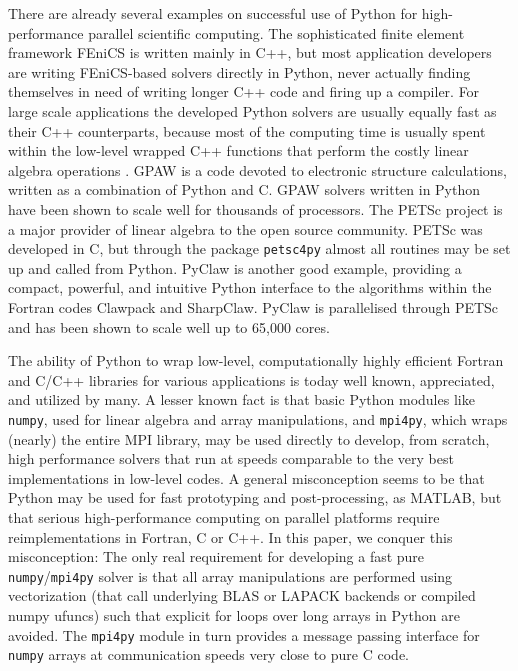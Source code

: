 \documentclass[11pt, oneside]{article}
\begin{document}
There are already several examples on successful use of Python for
high-performance parallel scientific computing. The sophisticated
finite element framework FEniCS \cite{fenics} is written mainly in
C++, but most application developers are writing FEniCS-based solvers
directly in Python, never actually finding themselves in need of
writing longer C++ code and firing up a compiler. For large scale
applications the developed Python solvers are usually equally fast as
their C++ counterparts, because most of the computing time is usually
spent within the low-level wrapped C++ functions that perform the
costly linear algebra operations \cite{Mortensen2015}.
GPAW \cite{gpaw05} is a code devoted
to electronic structure calculations, written as a combination of
Python and C. GPAW solvers written in Python have been shown to scale
well for thousands of processors.  The PETSc project \cite{petsc-web-page} is a major
provider of linear algebra to the open source community. PETSc was
developed in C, but through the package \texttt{petsc4py} almost all
routines may be set up and called from Python. PyClaw \cite{ketcheson2012}
is another good example, providing a compact, powerful, and intuitive
Python interface to the algorithms within the Fortran codes Clawpack
and SharpClaw. PyClaw is parallelised through PETSc and has been shown
to scale well up to 65,000 cores.

The ability of Python to wrap low-level, computationally highly efficient Fortran and C/C++ libraries for various applications is today well known, appreciated, and utilized by many. A lesser known fact is that basic Python modules like \texttt{numpy}, used for linear algebra and array manipulations, and \texttt{mpi4py}, which wraps (nearly) the entire MPI library, may be used directly to develop, from scratch, high performance solvers that run at speeds comparable to the very best implementations in low-level codes. A general misconception seems to be that Python may be used for fast prototyping and post-processing, as MATLAB, but that serious high-performance computing on parallel platforms require reimplementations in Fortran, C or C++. In this paper, we conquer this misconception: The only real requirement for developing a fast pure \texttt{numpy}/\texttt{mpi4py} solver is that all array manipulations are performed using vectorization (that call underlying BLAS or LAPACK backends or compiled numpy ufuncs) such that explicit for loops over long arrays in Python are avoided. The \texttt{mpi4py} module in turn provides a message passing interface for \texttt{numpy} arrays at communication speeds very close to pure C code.
\end{document}
